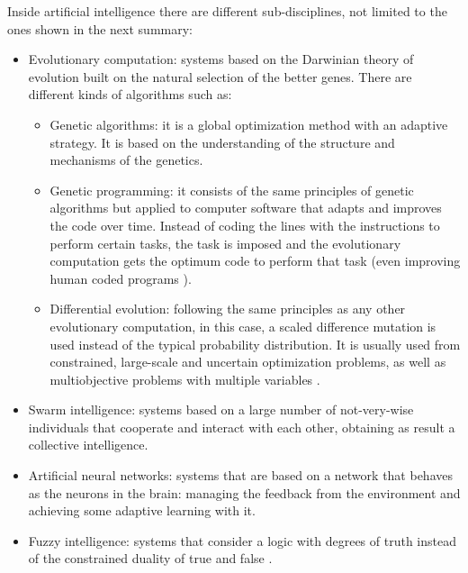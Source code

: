     Inside artificial intelligence there are different sub-disciplines, not limited to the ones shown in the next summary: 
    \begin{itemize}
        \item Evolutionary computation: systems based on the Darwinian theory of evolution built on the natural selection of the better genes. There are different kinds of algorithms such as:
            \begin{itemize}
                \item Genetic algorithms: it is a global optimization method with an adaptive strategy. It is based on the understanding of the structure and mechanisms of the genetics.
                \item Genetic programming: it consists of the same principles of genetic algorithms but applied to computer software that adapts and improves the code over time. Instead of coding the lines with the instructions to perform certain tasks, the task is imposed and the evolutionary computation gets the optimum code to perform that task \cite{koza2006genetic} (even improving human coded programs \cite{cramer1985representation}).
                \item Differential evolution: following the same principles as any other evolutionary computation, in this case, a scaled difference mutation is used instead of the typical probability distribution. It is usually used from constrained, large-scale and uncertain optimization problems, as well as multiobjective problems with multiple variables \cite{das2011differential}.
            \end{itemize}
        \item Swarm intelligence: systems based on a large number of not-very-wise individuals that cooperate and interact with each other, obtaining as result a collective intelligence.
        \newpage
        \item Artificial neural networks: systems that are based on a network that behaves as the neurons in the brain: managing the feedback from the environment and achieving some adaptive learning with it.
        \item Fuzzy intelligence: systems that consider a logic with degrees of truth instead of the constrained duality of true and false \cite{klir1996fuzzy}.
    \end{itemize}
    
